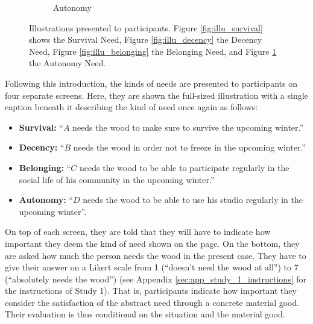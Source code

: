 \documentclass[egregdoesnotlikesansseriftitles]{scrartcl}
\begin{document}
\begin{figure}[ht!]
\begin{subfigure}[t]{0.45\textwidth}
      \caption{Autonomy}\label{fig:illu_autonomy}
   \end{subfigure}
   \caption{Illustrations presented to participants. Figure \ref{fig:illu_survival} shows the Survival Need, Figure \ref{fig:illu_decency} the Decency Need, Figure \ref{fig:illu_belonging} the Belonging Need, and Figure \ref{fig:illu_autonomy} the Autonomy Need.}\label{fig:illu}
\end{figure}

Following this introduction, the kinds of needs are presented to participants on four separate screens.
Here, they are shown the full-sized illustration with a single caption beneath it describing the kind of need once again as follows:

\begin{itemize}
   \item \textbf{Survival:} ``$A$ needs the wood to make sure to survive the upcoming winter.''
   \item \textbf{Decency:} ``$B$ needs the wood in order not to freeze in the upcoming winter.''
   \item \textbf{Belonging:} ``$C$ needs the wood to be able to participate regularly in the social life of his community in the upcoming winter.''
   \item \textbf{Autonomy:} ``$D$ needs the wood to be able to use his studio regularly in the upcoming winter''.
\end{itemize}

On top of each screen, they are told that they will have to indicate how important they deem the kind of need shown on the page.
On the bottom, they are asked how much the person needs the wood in the present case.
They have to give their answer on a Likert scale from 1 (``doesn't need the wood at all'') to 7 (``absolutely needs the wood'') (see Appendix \ref{sec:app_study_1_instructions} for the instructions of Study 1).
That is, participants indicate how important they consider the satisfaction of the abstract need through a concrete material good. Their evaluation is thus conditional on the situation and the material good.
\end{document}
